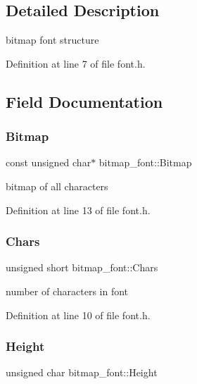 \subsection{Detailed Description}
bitmap font structure 

Definition at line 7 of file font.\+h.



\subsection{Field Documentation}
\mbox{\label{a00162_ad5f8561f63d121264f9d439594a16823_ad5f8561f63d121264f9d439594a16823}} 
\subsubsection{\texorpdfstring{Bitmap}{Bitmap}}
{\footnotesize\ttfamily const unsigned char$\ast$ bitmap\+\_\+font\+::\+Bitmap}



bitmap of all characters 



Definition at line 13 of file font.\+h.

\mbox{\label{a00162_a1d0dbc487d921c45ae1419e97c33c41c_a1d0dbc487d921c45ae1419e97c33c41c}} 
\subsubsection{\texorpdfstring{Chars}{Chars}}
{\footnotesize\ttfamily unsigned short bitmap\+\_\+font\+::\+Chars}



number of characters in font 



Definition at line 10 of file font.\+h.

\mbox{\label{a00162_a7f8ce01f522fe563639143b8faf083e2_a7f8ce01f522fe563639143b8faf083e2}} 
\subsubsection{\texorpdfstring{Height}{Height}}
{\footnotesize\ttfamily unsigned char bitmap\+\_\+font\+::\+Height}



